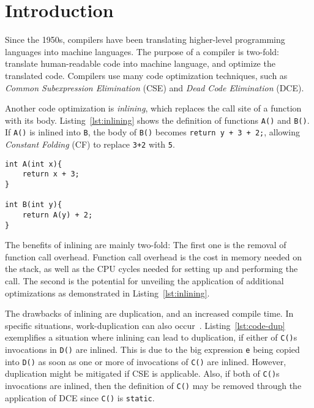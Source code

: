 
\section{Introduction}
\label{introduction}

Since the 1950s, compilers have been translating higher-level programming
languages into machine languages. The purpose of a compiler is two-fold:
translate human-readable code into machine language, and optimize the translated
code. Compilers use many code optimization techniques, such as \textit{Common
Subexpression Elimination} (CSE)\cite[Ch. 8.5]{DragonBook} and
\textit{Dead Code Elimination} (DCE)\cite[Ch. 8.5]{DragonBook}.

Another code optimization is \textit{inlining}\cite[Ch. 12.1]{DragonBook}, which
replaces the call site of a function with its body. Listing~\ref{lst:inlining}
shows the definition of functions \lstinline!A()! and \lstinline!B()!. If
\lstinline!A()! is inlined into \lstinline!B!, the body of \lstinline!B()!
becomes \lstinline!return y + 3 + 2;!, allowing \textit{Constant Folding}
(CF)\cite[Ch. 8.5]{DragonBook} to replace \lstinline!3+2! with \lstinline!5!.

\begin{centering}
	\noindent\begin{minipage}{\textwidth}
		\begin{CenteredBox}
		\begin{lstlisting}[style=global_customcpp]
int A(int x){
	return x + 3;
}

int B(int y){
	return A(y) + 2;
}
		\end{lstlisting}
		\end{CenteredBox}
	\end{minipage}
	\label{lst:inlining}
\end{centering}

The benefits of inlining are mainly two-fold: The first one is the removal of
function call overhead. Function call overhead is the cost in memory needed on
the stack, as well as the CPU cycles needed for setting up and performing the
call. The second is the potential for unveiling the application of additional
optimizations as demonstrated in Listing~\ref{lst:inlining}.

The drawbacks of inlining are  duplication, and an increased compile time.
In specific situations, work-duplication can also occur~\cite{GHCPaper}.
Listing~\ref{lst:code-dup} exemplifies a situation where inlining can lead to
 duplication, if either of \lstinline!C()!s invocations in \lstinline!D()!
are inlined. This is due to the big expression \lstinline!e! being copied into
\lstinline!D()! as soon as one or more of invocations of \lstinline!C()! are
inlined. However,  duplication might be mitigated if CSE is applicable.
Also, if both of \lstinline!C()!s invocations are inlined,
then the definition of \lstinline!C()! may be removed through the application of
DCE since \lstinline!C()! is \lstinline!static!.

